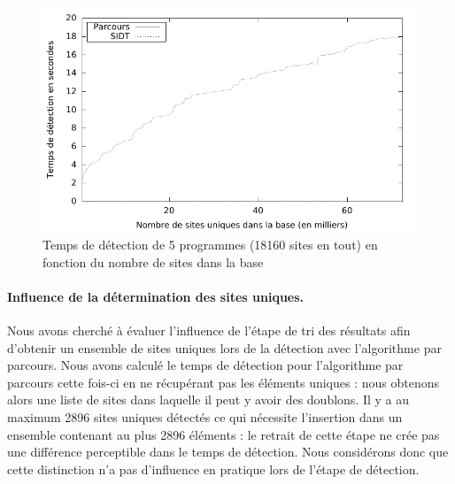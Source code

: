 \begin{figure}[h]
\begin{center}
\includegraphics{supports/plots/plotScan.pdf}
\end{center}
\caption{Temps de détection de 5 programmes (18160 sites en tout) en fonction du nombre de sites dans la base}
\label{fig:scan}
\end{figure}

\paragraph{Influence de la détermination des sites uniques.}
Nous avons cherché à évaluer l'influence de l'étape de tri des résultats afin d'obtenir un ensemble de sites uniques lors de la détection avec l'algorithme par parcours.
Nous avons calculé le temps de détection pour l'algorithme par parcours cette fois-ci en ne récupérant pas les éléments uniques : nous obtenons alors une liste de sites dans laquelle il peut y avoir des doublons. Il y a au maximum 2896 sites uniques détectés ce qui nécessite l'insertion dans un ensemble contenant au plus 2896 éléments : le retrait de cette étape ne crée pas une différence perceptible dans le temps de détection.
Nous considérons donc que cette distinction n'a pas d'influence en pratique lors de l'étape de détection.


